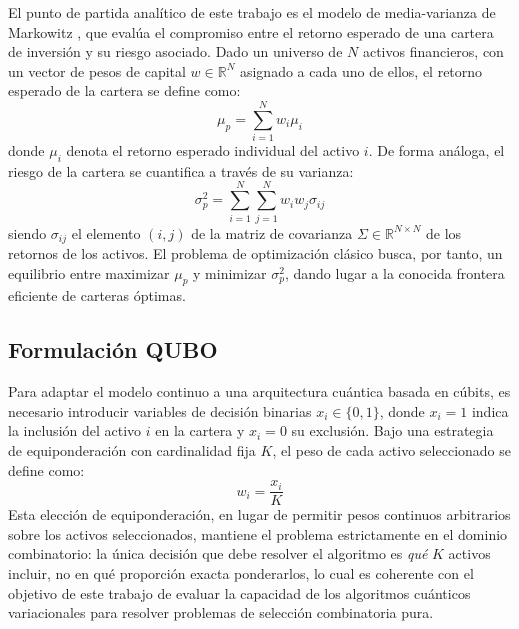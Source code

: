 El punto de partida analítico de este trabajo es el modelo de media-varianza de Markowitz \cite{Markowitz1952}, que evalúa el compromiso entre el retorno esperado de una cartera de inversión y su riesgo asociado. Dado un universo de $N$ activos financieros, con un vector de pesos de capital $w \in \mathbb{R}^N$ asignado a cada uno de ellos, el retorno esperado de la cartera se define como:
\begin{equation}
    \mu_p = \sum_{i=1}^{N} w_i \mu_i
    \label{eq:retorno_cartera}
\end{equation}
donde $\mu_i$ denota el retorno esperado individual del activo $i$. De forma análoga, el riesgo de la cartera se cuantifica a través de su varianza:
\begin{equation}
    \sigma_p^2 = \sum_{i=1}^{N} \sum_{j=1}^{N} w_i w_j \sigma_{ij}
    \label{eq:riesgo_cartera}
\end{equation}
siendo $\sigma_{ij}$ el elemento $(i,j)$ de la matriz de covarianza $\Sigma \in \mathbb{R}^{N \times N}$ de los retornos de los activos. El problema de optimización clásico busca, por tanto, un equilibrio entre maximizar $\mu_p$ y minimizar $\sigma_p^2$, dando lugar a la conocida frontera eficiente de carteras óptimas.

\subsection{Formulación QUBO}
\label{subsec:discretizacion_qubo}

Para adaptar el modelo continuo a una arquitectura cuántica basada en cúbits, es necesario introducir variables de decisión binarias $x_i \in \{0,1\}$, donde $x_i = 1$ indica la inclusión del activo $i$ en la cartera y $x_i = 0$ su exclusión. Bajo una estrategia de equiponderación con cardinalidad fija $K$, el peso de cada activo seleccionado se define como:
\begin{equation}
    w_i = \frac{x_i}{K}
    \label{eq:peso_equiponderado}
\end{equation}
Esta elección de equiponderación, en lugar de permitir pesos continuos arbitrarios sobre los activos seleccionados, mantiene el problema estrictamente en el dominio combinatorio: la única decisión que debe resolver el algoritmo es \emph{qué} $K$ activos incluir, no en qué proporción exacta ponderarlos, lo cual es coherente con el objetivo de este trabajo de evaluar la capacidad de los algoritmos cuánticos variacionales para resolver problemas de selección combinatoria pura.

